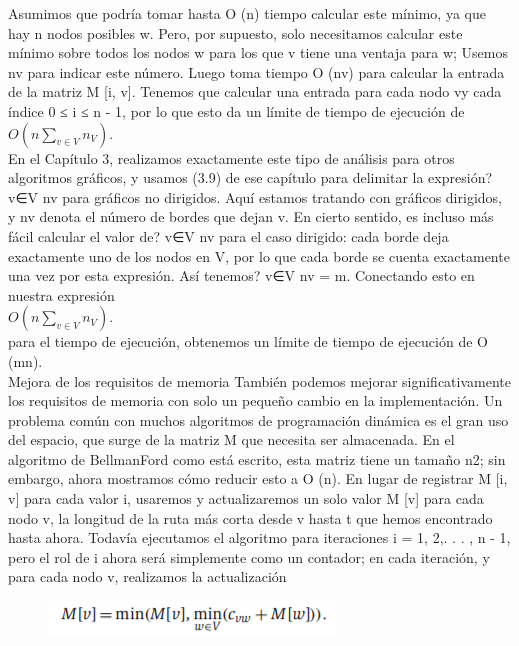 \documentclass[a4paper]{article}
\begin{document}
Asumimos que podría tomar hasta O (n) tiempo calcular este mínimo, ya que hay n nodos posibles w. Pero, por supuesto, solo necesitamos calcular este mínimo sobre todos los nodos w para los que v tiene una ventaja para w; Usemos nv para indicar este número. Luego toma tiempo O (nv) para calcular la entrada de la matriz M [i, v]. Tenemos que calcular una entrada para cada nodo vy cada índice 0 ≤ i ≤ n - 1, por lo que esto da un límite de tiempo de ejecución de\\

$O(n \sum_{v \in V} n_V)$.\\

En el Capítulo 3, realizamos exactamente este tipo de análisis para otros algoritmos gráficos, y usamos (3.9) de ese capítulo para delimitar la expresión? v∈V nv para gráficos no dirigidos. Aquí estamos tratando con gráficos dirigidos, y nv denota el número de bordes que dejan v. En cierto sentido, es incluso más fácil calcular el valor de? v∈V nv para el caso dirigido: cada borde deja exactamente uno de los nodos en V, por lo que cada borde se cuenta exactamente una vez por esta expresión. Así tenemos? v∈V nv = m. Conectando esto en nuestra expresión\\

$O(n \sum_{v \in V} n_V)$.\\

para el tiempo de ejecución, obtenemos un límite de tiempo de ejecución de O (mn).\\

Mejora de los requisitos de memoria También podemos mejorar significativamente los requisitos de memoria con solo un pequeño cambio en la implementación. Un problema común con muchos algoritmos de programación dinámica es el gran uso del espacio, que surge de la matriz M que necesita ser almacenada. En el algoritmo de BellmanFord como está escrito, esta matriz tiene un tamaño n2; sin embargo, ahora mostramos cómo reducir esto a O (n). En lugar de registrar M [i, v] para cada valor i, usaremos y actualizaremos un solo valor M [v] para cada nodo v, la longitud de la ruta más corta desde v hasta t que hemos encontrado hasta ahora. Todavía ejecutamos el algoritmo para iteraciones i = 1, 2,. . . , n - 1, pero el rol de i ahora será simplemente como un contador; en cada iteración, y para cada nodo v, realizamos la actualización\\

\begin{figure}[h]
\centering
\includegraphics[scale=0.9]{Imagenes-Seccion6/form6_5.PNG}
\end{figure}
\end{document}
